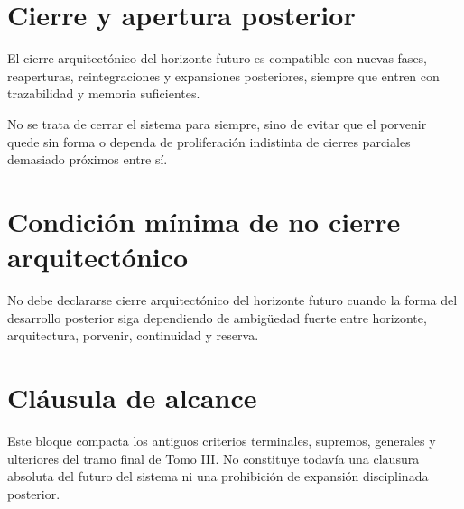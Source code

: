 \section{Cierre y apertura posterior}
\begin{observation}
El cierre arquitectónico del horizonte futuro es compatible con nuevas fases, reaperturas, reintegraciones y expansiones posteriores, siempre que entren con trazabilidad y memoria suficientes.
\end{observation}

\begin{observation}
No se trata de cerrar el sistema para siempre, sino de evitar que el porvenir quede sin forma o dependa de proliferación indistinta de cierres parciales demasiado próximos entre sí.
\end{observation}

\section{Condición mínima de no cierre arquitectónico}
\begin{definition}
No debe declararse cierre arquitectónico del horizonte futuro cuando la forma del desarrollo posterior siga dependiendo de ambigüedad fuerte entre horizonte, arquitectura, porvenir, continuidad y reserva.
\end{definition}

\section{Cláusula de alcance}
\begin{observation}
Este bloque compacta los antiguos criterios terminales, supremos, generales y ulteriores del tramo final de Tomo III. No constituye todavía una clausura absoluta del futuro del sistema ni una prohibición de expansión disciplinada posterior.
\end{observation}

